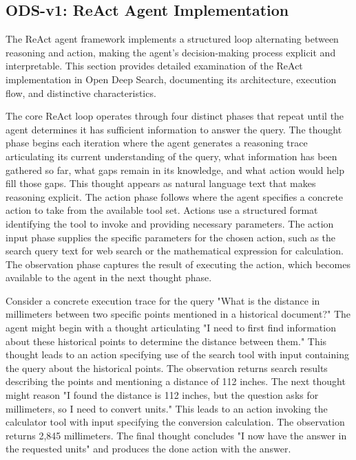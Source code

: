 \subsection{ODS-v1: ReAct Agent Implementation}

The ReAct agent framework implements a structured loop alternating between reasoning and action, making the agent's decision-making process explicit and interpretable. This section provides detailed examination of the ReAct implementation in Open Deep Search, documenting its architecture, execution flow, and distinctive characteristics.

The core ReAct loop operates through four distinct phases that repeat until the agent determines it has sufficient information to answer the query. The thought phase begins each iteration where the agent generates a reasoning trace articulating its current understanding of the query, what information has been gathered so far, what gaps remain in its knowledge, and what action would help fill those gaps. This thought appears as natural language text that makes reasoning explicit. The action phase follows where the agent specifies a concrete action to take from the available tool set. Actions use a structured format identifying the tool to invoke and providing necessary parameters. The action input phase supplies the specific parameters for the chosen action, such as the search query text for web search or the mathematical expression for calculation. The observation phase captures the result of executing the action, which becomes available to the agent in the next thought phase.

Consider a concrete execution trace for the query "What is the distance in millimeters between two specific points mentioned in a historical document?" The agent might begin with a thought articulating "I need to first find information about these historical points to determine the distance between them." This thought leads to an action specifying use of the search tool with input containing the query about the historical points. The observation returns search results describing the points and mentioning a distance of 112 inches. The next thought might reason "I found the distance is 112 inches, but the question asks for millimeters, so I need to convert units." This leads to an action invoking the calculator tool with input specifying the conversion calculation. The observation returns 2,845 millimeters. The final thought concludes "I now have the answer in the requested units" and produces the done action with the answer.

